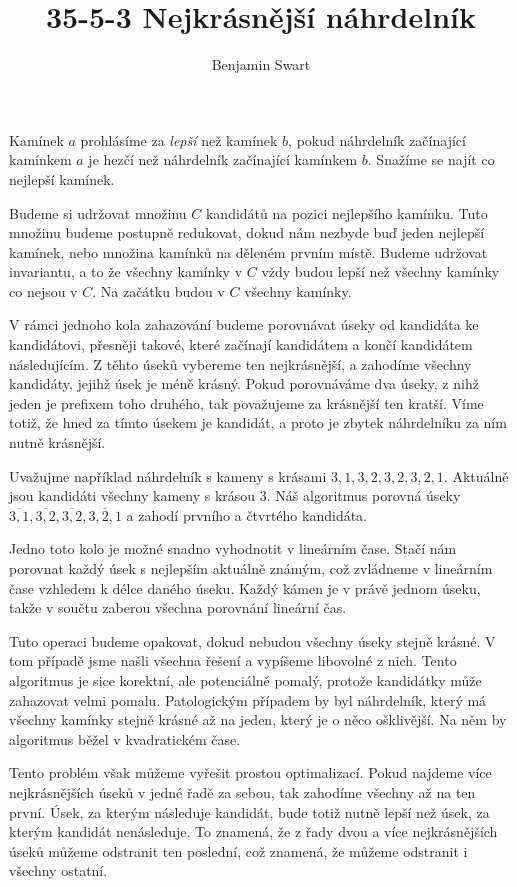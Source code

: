 \documentclass{article}
\title{35-5-3 Nejkrásnější náhrdelník}
\author{Benjamin Swart}
\begin{document}
\maketitle

Kamínek $a$ prohlásíme za \textit{lepší} než kamínek $b$, pokud náhrdelník začínající kamínkem $a$ je hezčí než náhrdelník začínající kamínkem $b$. Snažíme se najít co nejlepší kamínek.

Budeme si udržovat množinu $C$ kandidátů na pozici nejlepšího kamínku. Tuto množinu budeme postupně redukovat, dokud nám nezbyde buď jeden nejlepší kamínek, nebo množina kamínků na děleném prvním místě. Budeme udržovat invariantu, a to že všechny kamínky v $C$ vždy budou lepší než všechny kamínky co nejsou v $C$. Na začátku budou v $C$ všechny kamínky.

V rámci jednoho kola zahazování budeme porovnávat úseky od kandidáta ke kandidátovi, přesněji takové, které začínají kandidátem a končí kandidátem následujícím. Z těhto úseků vybereme ten nejkrásnější, a zahodíme všechny kandidáty, jejihž úsek je méně krásný. Pokud porovnáváme dva úseky, z nihž jeden je prefixem toho druhého, tak považujeme za krásnější ten kratší. Víme totiž, že hned za tímto úsekem je kandidát, a proto je zbytek náhrdelníku za ním nutně krásnější.

Uvažujme například náhrdelník s kameny s krásami $3,1,3,2,3,2,3,2,1$. Aktuálně jsou kandidáti všechny kameny s krásou $3$. Náš algoritmus porovná úseky $\overline{3,1},\overline{3,2},\overline{3,2},\overline{3,2,1}$ a zahodí prvního a čtvrtého kandidáta.

Jedno toto kolo je možné snadno vyhodnotit v lineárním čase. Stačí nám porovnat každý úsek s nejlepším aktuálně známým, což zvládneme v lineárním čase vzhledem k délce daného úseku. Každý kámen je v právě jednom úseku, takže v součtu zaberou všechna porovnání lineární čas.

Tuto operaci budeme opakovat, dokud nebudou všechny úseky stejně krásné. V tom případě jsme našli všechna řešení a vypíšeme libovolné z nich. Tento algoritmus je sice korektní, ale potenciálně pomalý, protože kandidátky může zahazovat velmi pomalu. Patologickým případem by byl náhrdelník, který má všechny kamínky stejně krásné až na jeden, který je o něco ošklivější. Na něm by algoritmus běžel v kvadratickém čase.

Tento problém však můžeme vyřešit prostou optimalizací. Pokud najdeme více nejkrásnějších úseků v jedné řadě za sebou, tak zahodíme všechny až na ten první. Úsek, za kterým následuje kandidát, bude totiž nutně lepší než úsek, za kterým kandidát nenásleduje. To znamená, že z řady dvou a více nejkrásnějších úseků můžeme odstranit ten poslední, což znamená, že můžeme odstranit i všechny ostatní.
\end{document}

